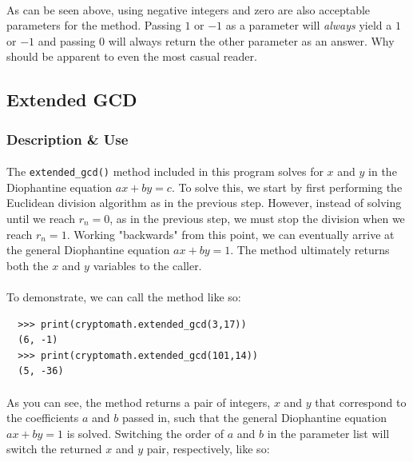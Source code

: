 \documentclass[12pt,a4paper]{article}
\begin{document}
\paragraph{}
As can be seen above, using negative integers and zero are also acceptable 
parameters for the method.  Passing $1$ or $-1$ as a parameter will 
\textit{always} yield a $1$ or $-1$ and passing $0$ will always return the 
other parameter as an answer.  Why should be apparent to even the most casual 
reader.


\subsection{Extended GCD}
\subsubsection{Description \& Use}
\paragraph{}
The \verb|extended_gcd()| method included in this program solves for $x$ and 
$y$ in the Diophantine equation $ax + by = c$.  To solve this, we start by 
first performing the Euclidean division algorithm as in the previous step.  
However, instead of solving until we reach $r_n = 0$, as in the previous step, 
we must stop the division when we reach $r_n = 1$.  Working "backwards" from 
this point, we can eventually arrive at the general Diophantine equation 
$ax + by = 1$.  The method ultimately returns both the $x$ and $y$ variables 
to the caller.

\paragraph{}
To demonstrate, we can call the method like so:

\begin{verbatim}
  >>> print(cryptomath.extended_gcd(3,17)) 
  (6, -1)
  >>> print(cryptomath.extended_gcd(101,14)) 
  (5, -36)
\end{verbatim}

\paragraph{}
As you can see, the method returns a pair of integers, $x$ and $y$ that 
correspond to the coefficients $a$ and $b$ passed in, such that the general 
Diophantine equation $ax + by = 1$ is solved.  Switching the order of $a$ and 
$b$ in the parameter list will switch the returned $x$ and $y$ pair, 
respectively, like so:
\end{document}
